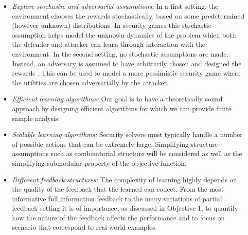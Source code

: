 \begin{itemize}
\item \textit{Explore stochastic and adversarial assumptions:} In a first setting, the environment chooses the rewards stochastically, based on some predetermined (however unknown) distributions. In security games this stochastic assumption helps model the unknown dynamics of the problem which both the defender and attacker can learn through interaction with the environment. In the second setting, no stochastic assumptions are made. Instead, an adversary is assumed to have arbitrarily chosen and designed the rewards
\cite{Auer03NS}. This can be used to model a more pessimistic security game where the utilities are chosen adversarially by the attacker.
\item \textit{Efficient learning algorithms:} 
Our goal is to have a theoretically sound approach by designing efficient algorithms for which we can provide finite sample analysis. %

\item \textit{Scalable learning algorithms:} Security solvers must typically handle a number of possible actions that can be extremely large.
Simplifying structure assumptions such as combinatorial structure will be considered as well as the simplifying submodular property of the objective function.

\item \textit{Different feedback structures:} The complexity of learning highly depends on the quality of the feedback that the learned can collect. From the most informative full information feedback to the many variations of partial feedback setting it is of importance, as discussed in Objective 1, to quantify how the nature of the feedback  affects the performance and to focus on scenario that correspond to real world examples.


\end{itemize}
